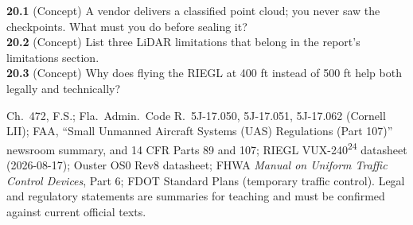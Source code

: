 \begin{tryit}
\textbf{20.1} (Concept) A vendor delivers a classified point cloud; you never saw the checkpoints. What must you do before sealing it?\\
\textbf{20.2} (Concept) List three LiDAR limitations that belong in the report's limitations section.\\
\textbf{20.3} (Concept) Why does flying the RIEGL at 400 ft instead of 500 ft help both legally and technically?
\end{tryit}

\begin{tcolorbox}[base,colback=gray!4,colframe=grayx,title={SOURCES FOR THIS MODULE}]
\footnotesize
Ch.\ 472, F.S.; Fla.\ Admin.\ Code R.\ 5J-17.050, 5J-17.051, 5J-17.062 (Cornell LII); FAA, ``Small Unmanned Aircraft Systems (UAS) Regulations (Part 107)'' newsroom summary, and 14 CFR Parts 89 and 107; RIEGL VUX-240\textsuperscript{24} datasheet (2026-08-17); Ouster OS0 Rev8 datasheet; FHWA \emph{Manual on Uniform Traffic Control Devices}, Part 6; FDOT Standard Plans (temporary traffic control). Legal and regulatory statements are summaries for teaching and must be confirmed against current official texts.
\end{tcolorbox}
